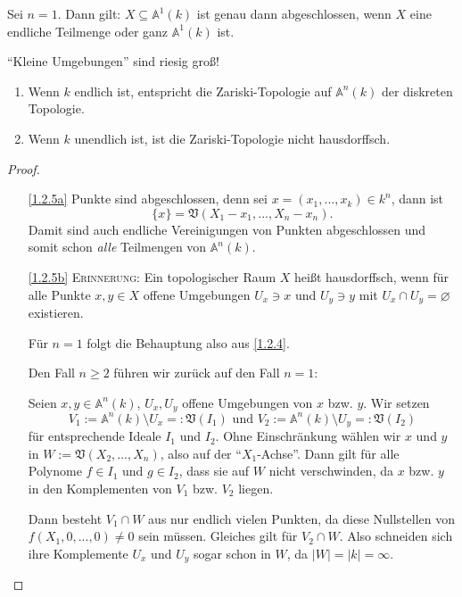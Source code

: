 \documentclass[a4paper,12pt,index=toc]{scrbook}
\theoremstyle{keinenummern} %
\def\A{\mathbb{A}}
\def\V{\mathfrak{V}}
\newcommand{\leer}{\ensuremath{\varnothing}}
\newcommand{\card}[1]{|#1|}
\renewcommand{\dotsc}{\ensuremath{\!...}}
\begin{document}
\begin{bsp}\label{1.2.4}
Sei $n=1$. Dann gilt: $X\subseteq\A^{1}(k)$ ist genau dann abgeschlossen, wenn $X$ eine endliche Teilmenge oder ganz $\A^{1}(k)$ ist.
\end{bsp}

\begin{w}\enquote{Kleine Umgebungen} sind riesig groß!\end{w}

\begin{bem}\label{1.2.5}
\begin{enumerate}
\item{} Wenn $k$ endlich ist, entspricht die Zariski-Topologie auf $\A^{n}(k)$ der diskreten Topologie.
\item{} Wenn $k$ unendlich ist, ist die Zariski-Topologie nicht hausdorffsch.
\end{enumerate}\end{bem}
\begin{proof}\begin{enumerate}
\item[\ref{1.2.5a}] Punkte sind abgeschlossen, denn sei $x=(x_{1},\dotsc,x_{k})\in k^{n}$, dann ist
\begin{equation*}\{x\}=\V(X_{1}-x_{1},\dotsc,X_{n}-x_{n}).\end{equation*}
Damit sind auch endliche Vereinigungen von Punkten abgeschlossen und somit schon \textit{alle} Teilmengen von $\A^{n}(k)$.
\item[\ref{1.2.5b}] {\scshape Erinnerung:} Ein topologischer Raum $X$ heißt hausdorffsch, wenn für alle Punkte $x,y\in X$ offene Umgebungen $U_{x}\ni x$ und $U_{y}\ni y$ mit $U_{x}\cap U_{y}=\leer$ existieren.

Für $n=1$ folgt die Behauptung also aus \cref{1.2.4}.

Den Fall $n\geq 2$ führen wir zurück auf den Fall $n=1$:

Seien $x,y\in\A^{n}(k)$, $U_{x},U_{y}$ offene Umgebungen von $x$ bzw. $y$. Wir setzen
\begin{equation*}V_{1}:=\A^{n}(k)\setminus U_{x} =: \V(I_{1})\text{ und }V_{2}:=\A^{n}(k)\setminus U_{y}=:\V(I_{2})\end{equation*}
für entsprechende Ideale $I_{1}$ und $I_{2}$. Ohne  Einschränkung wählen wir $x$ und $y$ in $W:=\V(X_{2},\dotsc,X_{n})$, also auf der \enquote{$X_{1}$-Achse}. Dann gilt für alle Polynome $f\in I_{1}$ und $g\in I_{2}$, dass sie auf $W$ nicht verschwinden, da $x$ bzw. $y$ in den Komplementen von $V_{1}$ bzw. $V_{2}$ liegen.

Dann besteht $V_{1}\cap W$ aus nur endlich vielen Punkten, da diese Nullstellen von $f(X_{1},0,\dotsc,0)\neq 0$ sein müssen. Gleiches gilt für $V_{2}\cap W$. Also schneiden sich ihre Komplemente $U_{x}$ und $U_{y}$ sogar schon in $W$, da $\card{W}=\card{k}=\infty$.
\end{enumerate}\end{proof}
\end{document}
